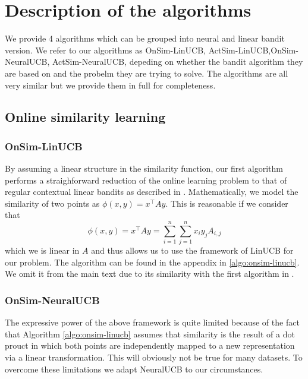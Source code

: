 \documentclass{article}
\begin{document}
\section{Description of the algorithms}
We provide 4 algorithms  which can be grouped into neural and linear bandit version. We refer to our algorithms as OnSim-LinUCB, ActSim-LinUCB,OnSim-NeuralUCB, ActSim-NeuralUCB, depeding on whether the bandit algorithm they are based on and the probelm
they are trying to solve. The algorithms are all very similar but we provide them in full for completeness.


\subsection{Online similarity learning}
\subsubsection{OnSim-LinUCB}
By assuming a linear structure in the similarity function, our first algorithm performs a straighforward reduction of the online learning problem to that of regular contextual linear bandits as described in \cite{linucb}.
Mathematically, we model the similarity of two points as  $\phi(x, y) = x^\top A y$.
This is reasonable if we consider that
\[\phi(x, y) = x^\top A y = \sum_{i =1}^n\sum_{j=1}^n x_i y_j A_{i,j} \]
which we is linear in $A$ and thus allows us to use the framework of LinUCB for our problem.
The algorithm can be found in the appendix in \ref{algo:onsim-linucb}. We omit it from the main text due to its similarity with the first algorithm in \cite{linucb}.


\subsubsection{OnSim-NeuralUCB}
The expressive power of the above framework is quite limited because of the fact that Algorithm \ref{algo:onsim-linucb} assumes that similarity is the result
of a dot prouct in which both points are independently mapped to a new representation via a linear transformation. This will obviously not be true for many datasets.
To overcome these limitations we adapt NeuralUCB \cite{neuralucb} to our circumstances.
\end{document}
